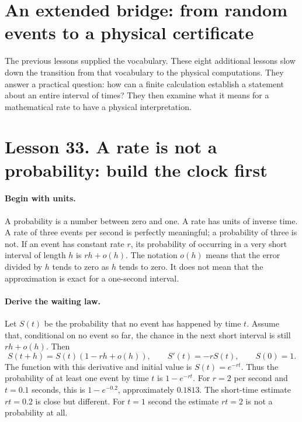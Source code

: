 \clearpage
\section*{An extended bridge: from random events to a physical certificate}
The previous lessons supplied the vocabulary. These eight additional lessons
slow down the transition from that vocabulary to the physical computations.
They answer a practical question: how can a finite calculation establish a
statement about an entire interval of times? They then examine what it means
for a mathematical rate to have a physical interpretation.

\section*{Lesson 33. A rate is not a probability: build the clock first}
\paragraph{Begin with units.}
A probability is a number between zero and one. A rate has units of inverse
time. A rate of three events per second is perfectly meaningful; a probability
of three is not. If an event has constant rate $r$, its probability of occurring
in a very short interval of length $h$ is $rh+o(h)$. The notation $o(h)$ means
that the error divided by $h$ tends to zero as $h$ tends to zero. It does not
mean that the approximation is exact for a one-second interval.

\paragraph{Derive the waiting law.}
Let $S(t)$ be the probability that no event has happened by time $t$.
Assume that, conditional on no event so far, the chance in the next short
interval is still $rh+o(h)$. Then
\[
 S(t+h)=S(t)(1-rh+o(h)),\qquad S'(t)=-rS(t),\qquad S(0)=1.
\]
The function with this derivative and initial value is $S(t)=e^{-rt}$.
Thus the probability of at least one event by time $t$ is $1-e^{-rt}$.
For $r=2$ per second and $t=0.1$ seconds, this is $1-e^{-0.2}$,
approximately $0.1813$. The short-time estimate $rt=0.2$ is close but different.
For $t=1$ second the estimate $rt=2$ is not a probability at all.

